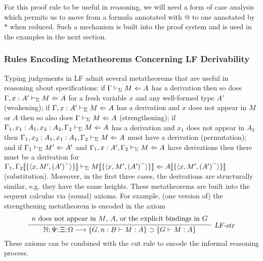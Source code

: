 For this proof rule to be useful in reasoning, we will need a form of
case analysis which permits us to move from a formula annotated with
$@$ to one annotated by $*$ when reduced. 
%
Such a mechanism is built into the proof system and is used in the
examples in the next section.

\subsubsection{Rules Encoding Metatheorems Concerning LF Derivability}

Typing judgements in LF admit several metatheorems that are useful in
reasoning about specifications: if $\lfchecktype{\Gamma}{M}{A}$ has a
derivation then so does $\lfchecktype{\Gamma, x : A'}{M}{A}$ for a fresh
variable $x$ and any well-formed type $A'$ (weakening); if
$\lfchecktype{\Gamma, x : A'}{M}{A}$ has a derivation and $x$ does not
appear in $M$ or $A$ then so also does $\lfchecktype{\Gamma}{M}{A}$
(strengthening); if $\lfchecktype{\Gamma_1, x_1 : A_1, x_2 : A_2, \Gamma_2}{M}{A}$ has
a derivation and $x_1$ does not appear in $A_2$ then 
$\lfchecktype{\Gamma_1, x_2 : A_1, x_1 : A_1, \Gamma_2}{M}{A}$ must have a derivation
(permutation); and if $\lfchecktype{\Gamma_1}{M'}{A'}$ and
$\lfchecktype{\Gamma_1,x:A',\Gamma_2}{M}{A}$ have derivations then there
must be a derivation for
$\lfchecktype{\Gamma_1,\hsubst{\{\langle x,M',\erase{A'}\rangle\}}{\Gamma_2}}
         {\hsubst{\{\langle x,M',\erase{A'}\rangle\}}{M}}
         {\hsubst{\{\langle x,M',\erase{A'}\rangle\}}{A}}$ (substitution). 
%
Moreover, in the first three cases, the derivations are structurally
similar, e.g. they have the same heights.
%
These metatheorems are built into the sequent calculus via (sound)
axioms.
%
For example, (one version of) the strengthening metatheorem is encoded
in the axiom
\[
\infer[\lfstr]
      {\seq{\mathbb{N}}{\Psi}{\Xi}{\Omega}{\fimp{\fatm{G,n:B}{M:A}}{\fatm{G}{M:A}}}}
      {\begin{array}{c}
         n\mbox{ does not appear in }M\mbox{, } A\mbox{, or the explicit bindings in }G
       \end{array}}
\]
%
These axioms can be combined with the cut rule to encode the informal reasoning process. 
